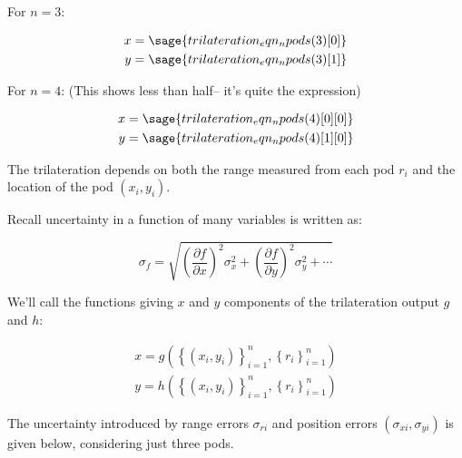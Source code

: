 \documentclass[10pt,letterpaper]{article}
\begin{document}
For $n = 3$:

\begin{align*}
    x &= \sage{trilateration_eqn_npods(3)[0]} \\
    y &= \sage{trilateration_eqn_npods(3)[1]}
\end{align*}

For $n = 4$: (This shows less than half-- it's quite the expression)

\begin{align*}
    x &= \sage{trilateration_eqn_npods(4)[0][0]} \\
    y &= \sage{trilateration_eqn_npods(4)[1][0]}
\end{align*}

The trilateration depends on both the range measured from each pod $r_i$ and the location of the pod $(x_i, y_i)$. 

Recall uncertainty in a function of many variables is written as:

\begin{equation*}
    \sigma_f = \sqrt{\left( \frac{\partial f}{\partial x} \right)^2 \sigma_x ^ 2 + \left( \frac{\partial f}{\partial y} \right)^2 \sigma_y ^ 2  + \cdots}
\end{equation*}


We'll call the functions giving $x$ and $y$ components of the trilateration output $g$ and $h$:

\begin{align*}
    x = g(\left\{ (x_i, y_i) \right\}_{i=1}^n, \left\{r_i \right\}_{i=1}^n ) \\ 
    y = h(\left\{ (x_i, y_i) \right\}_{i=1}^n, \left\{r_i \right\}_{i=1}^n)
\end{align*}

The uncertainty introduced by range errors $\sigma_{ri}$ and position errors $(\sigma_{xi}, \sigma_{yi})$ is given below, considering just three pods.
\end{document}
